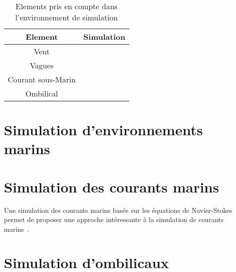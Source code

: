 		\begin{table}[ht]
			\centering
			\begin{tabular}{|c|c|}
				\hline
				Element & Simulation \\
				\hline
				Vent & \xmark\\
				\hline
				Vagues & \xmark\\
				\hline
				Courant sous-Marin & \cmark \\
				\hline
				Ombilical & \cmark \\
				\hline
			\end{tabular}
			\caption{Elements pris en compte dans l'environnement de simulation}
			\label{table:elements}
		\end{table}

	\section{Simulation d'environnements marins}

		

	\section{Simulation des courants marins}

		Une simulation des courants marins basée sur les équations de Navier-Stokes permet de proposer une approche intéressante à la simulation de courants marins~\cite{Garau2006current}.

	\section{Simulation d'ombilicaux}

		
	